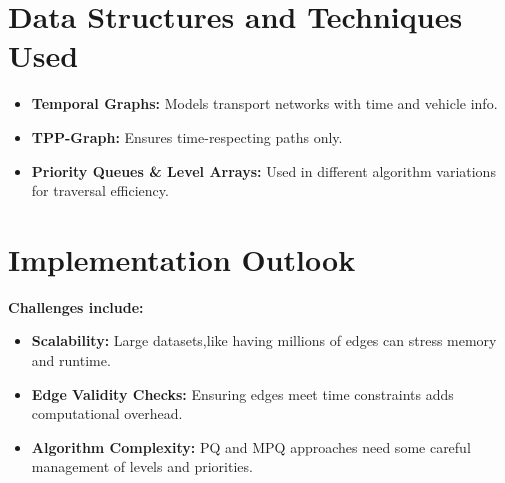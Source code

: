 \documentclass[11pt]{article}
\begin{document}
\section{Data Structures and Techniques Used}

\begin{itemize}
    \item \textbf{Temporal Graphs:} Models transport networks with time and vehicle info.
    \item \textbf{TPP-Graph:} Ensures time-respecting paths only.
    \item \textbf{Priority Queues \& Level Arrays:} Used in different algorithm variations for traversal efficiency.
   
\end{itemize}

\section{Implementation Outlook}

\textbf{Challenges include:}
\begin{itemize}
    \item \textbf{Scalability:} Large datasets,like having millions of edges can stress memory and runtime.
    \item \textbf{Edge Validity Checks:} Ensuring edges meet time constraints adds computational overhead.
    \item \textbf{Algorithm Complexity:} PQ and MPQ approaches need some careful management of levels and priorities.
   
\end{itemize}
\end{document}
